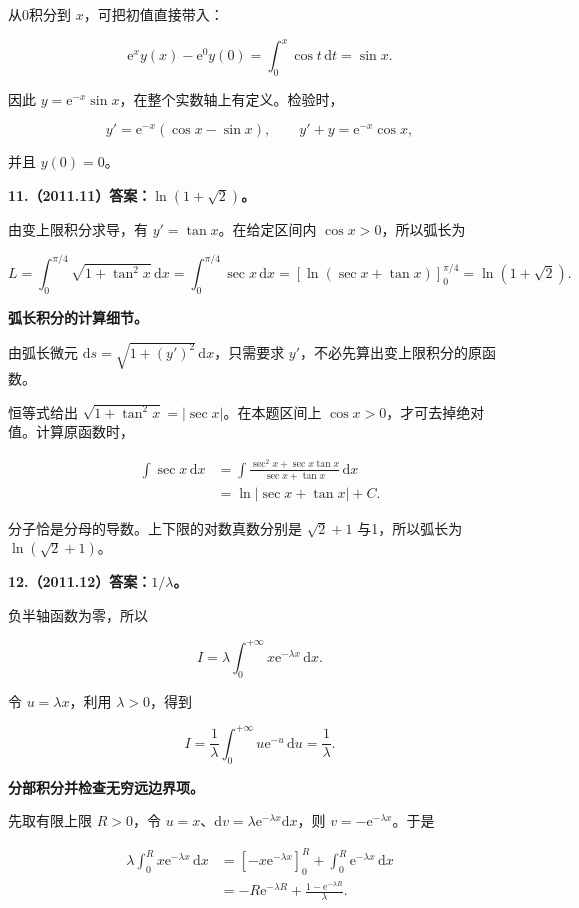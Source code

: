 \documentclass[UTF8,11pt,fontset=windows]{ctexart}
\begin{document}
从0积分到 $x$，可把初值直接带入：

$$
\mathrm e^xy(x)-\mathrm e^0y(0)
=\int_0^x\cos t\,\mathrm dt=\sin x.
$$

因此 $y=\mathrm e^{-x}\sin x$，在整个实数轴上有定义。检验时，

$$
y'=\mathrm e^{-x}(\cos x-\sin x),
\qquad y'+y=\mathrm e^{-x}\cos x,
$$

并且 $y(0)=0$。

\clearpage

\textbf{11.（2011.11）答案：$\ln(1+\sqrt2)$。}

由变上限积分求导，有 $y'=\tan x$。在给定区间内 $\cos x>0$，所以弧长为

$$
L=\int_0^{\pi/4}\sqrt{1+\tan^2x}\,\mathrm dx
=\int_0^{\pi/4}\sec x\,\mathrm dx
=\left[\ln(\sec x+\tan x)\right]_0^{\pi/4}
=\ln(1+\sqrt2).
$$

\textbf{弧长积分的计算细节。}

由弧长微元 $\mathrm ds=\sqrt{1+(y')^2}\,\mathrm dx$，只需要求 $y'$，不必先算出变上限积分的原函数。

恒等式给出 $\sqrt{1+\tan^2x}=|\sec x|$。在本题区间上 $\cos x>0$，才可去掉绝对值。计算原函数时，

$$
\begin{aligned}
\int\sec x\,\mathrm dx
&=\int\frac{\sec^2x+\sec x\tan x}{\sec x+\tan x}\,\mathrm dx\\
&=\ln|\sec x+\tan x|+C.
\end{aligned}
$$

分子恰是分母的导数。上下限的对数真数分别是 $\sqrt2+1$ 与1，所以弧长为 $\ln(\sqrt2+1)$。

\clearpage

\textbf{12.（2011.12）答案：$1/\lambda$。}

负半轴函数为零，所以

$$
I=\lambda\int_0^{+\infty}x\mathrm e^{-\lambda x}\,\mathrm dx.
$$

令 $u=\lambda x$，利用 $\lambda>0$，得到

$$
I=\frac1\lambda\int_0^{+\infty}u\mathrm e^{-u}\,\mathrm du=\frac1\lambda.
$$

\textbf{分部积分并检查无穷远边界项。}

先取有限上限 $R>0$，令 $u=x$、$\mathrm dv=\lambda\mathrm e^{-\lambda x}\mathrm dx$，则 $v=-\mathrm e^{-\lambda x}$。于是

$$
\begin{aligned}
\lambda\int_0^R x\mathrm e^{-\lambda x}\,\mathrm dx
&=[-x\mathrm e^{-\lambda x}]_0^R+\int_0^R\mathrm e^{-\lambda x}\,\mathrm dx\\
&=-R\mathrm e^{-\lambda R}+\frac{1-\mathrm e^{-\lambda R}}\lambda.
\end{aligned}
$$
\end{document}
